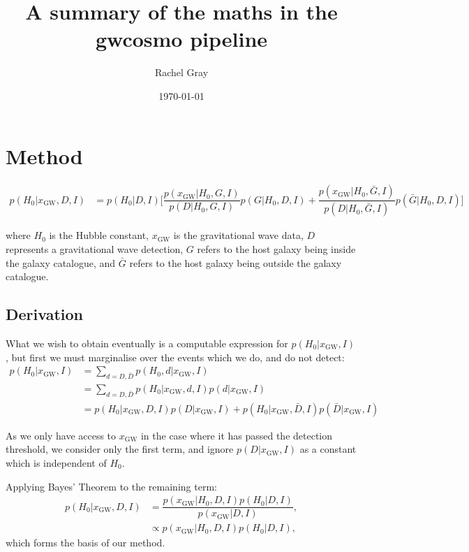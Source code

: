 \documentclass[a4paper,10pt]{article}
\title{A summary of the maths in the gwcosmo pipeline}
\author{Rachel Gray}
\date{\today} %
\begin{document}
\maketitle

\section{Method}
\begin{equation} \label{Eq:Master Equation}
\begin{aligned}
p(H_0|x_{\text{GW}},D,I) &= p(H_0|D,I) \bigg[ \dfrac{p(x_{\text{GW}}|H_0,G,I)}{p(D|H_0,G,I)} p(G|H_0,D,I) + \dfrac{p(x_{\text{GW}}|H_0,\bar{G},I)}{p(D|H_0,\bar{G},I)} p(\bar{G}|H_0,D,I) \bigg]
\end{aligned}
\end{equation}{
where $H_0$ is the Hubble constant, $x_{\text{GW}}$ is the gravitational wave data, $D$ represents a gravitational wave detection, $G$ refers to the host galaxy being inside the galaxy catalogue, and $\bar{G}$ refers to the host galaxy being outside the galaxy catalogue.

\subsection{Derivation} \label{sec:derivation}
What we wish to obtain eventually is a computable expression for $p(H_0|x_{\text{GW}},I)$, but first we must marginalise over the events which we do, and do not detect:
\begin{equation} \label{Eq:sum D}
\begin{aligned}
p(H_0|x_{\text{GW}},I) &= \sum_{d=D,\bar{D}} p(H_0,d|x_{\text{GW}},I)
\\ &= \sum_{d=D,\bar{D}} p(H_0|x_{\text{GW}},d,I) p(d|x_{\text{GW}},I)
\\ &= p(H_0|x_{\text{GW}},D,I) p(D|x_{\text{GW}},I) + p(H_0|x_{\text{GW}},\bar{D},I) p(\bar{D}|x_{\text{GW}},I)
\end{aligned} 
\end{equation}

As we only have access to $x_{\text{GW}}$ in the case where it has passed the detection threshold, we consider only the first term, and ignore $p(D|x_{\text{GW}},I)$ as a constant which is independent of $H_0$.

Applying Bayes' Theorem to the remaining term:
\begin{equation} \label{Eq:posterior}
\begin{aligned}
p(H_0|x_{\text{GW}},D,I) &= \dfrac{p(x_{\text{GW}}|H_0,D,I)p(H_0|D,I)}{p(x_{\text{GW}}|D,I)},
\\ &\propto p(x_{\text{GW}}|H_0,D,I)p(H_0|D,I),
\end{aligned} 
\end{equation}
which forms the basis of our method.

}
\end{document}
